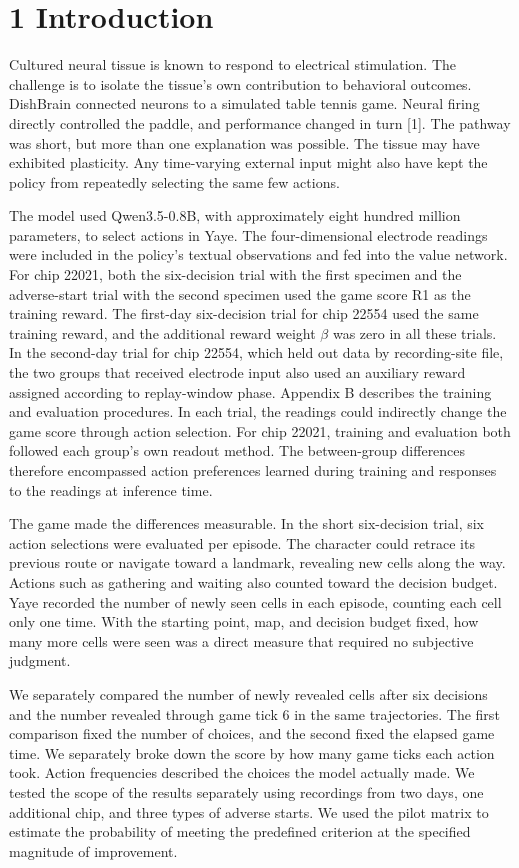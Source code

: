 \documentclass{article}
\begin{document}
\section*{1 Introduction}


Cultured neural tissue is known to respond to electrical stimulation. The challenge is to isolate the tissue's own contribution to behavioral outcomes. DishBrain connected neurons to a simulated table tennis game. Neural firing directly controlled the paddle, and performance changed in turn [1]. The pathway was short, but more than one explanation was possible. The tissue may have exhibited plasticity. Any time-varying external input might also have kept the policy from repeatedly selecting the same few actions.


The model used Qwen3.5-0.8B, with approximately eight hundred million parameters, to select actions in Yaye. The four-dimensional electrode readings were included in the policy's textual observations and fed into the value network. For chip 22021, both the six-decision trial with the first specimen and the adverse-start trial with the second specimen used the game score R1 as the training reward. The first-day six-decision trial for chip 22554 used the same training reward, and the additional reward weight \ensuremath{\beta} was zero in all these trials. In the second-day trial for chip 22554, which held out data by recording-site file, the two groups that received electrode input also used an auxiliary reward assigned according to replay-window phase. Appendix B describes the training and evaluation procedures. In each trial, the readings could indirectly change the game score through action selection. For chip 22021, training and evaluation both followed each group's own readout method. The between-group differences therefore encompassed action preferences learned during training and responses to the readings at inference time.


The game made the differences measurable. In the short six-decision trial, six action selections were evaluated per episode. The character could retrace its previous route or navigate toward a landmark, revealing new cells along the way. Actions such as gathering and waiting also counted toward the decision budget. Yaye recorded the number of newly seen cells in each episode, counting each cell only one time. With the starting point, map, and decision budget fixed, how many more cells were seen was a direct measure that required no subjective judgment.


We separately compared the number of newly revealed cells after six decisions and the number revealed through game tick 6 in the same trajectories. The first comparison fixed the number of choices, and the second fixed the elapsed game time. We separately broke down the score by how many game ticks each action took. Action frequencies described the choices the model actually made. We tested the scope of the results separately using recordings from two days, one additional chip, and three types of adverse starts. We used the pilot matrix to estimate the probability of meeting the predefined criterion at the specified magnitude of improvement.
\end{document}
